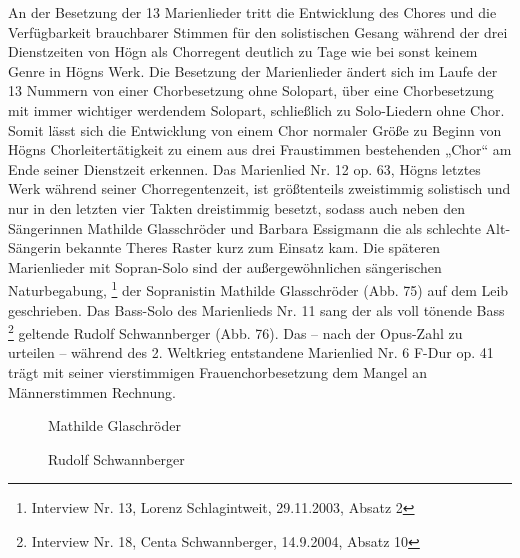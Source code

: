 An der Besetzung der 13 Marienlieder tritt die Entwicklung des Chores
und die Verfügbarkeit brauchbarer Stimmen für den solistischen Gesang
während der drei Dienstzeiten von Högn als Chorregent deutlich zu Tage
wie bei sonst keinem Genre in Högns Werk. Die Besetzung der
Marienlieder ändert sich im Laufe der 13 Nummern von einer
Chorbesetzung ohne Solopart, über eine Chorbesetzung mit immer
wichtiger werdendem Solopart, schließlich zu Solo-Liedern ohne Chor.
Somit lässt sich die Entwicklung von einem Chor normaler Größe zu
Beginn von Högns Chorleitertätigkeit zu einem aus drei Fraustimmen
bestehenden „Chor“ am Ende seiner Dienstzeit erkennen. Das Marienlied
Nr. 12 op. 63, Högns letztes Werk während seiner Chorregentenzeit, ist
größtenteils zweistimmig solistisch und nur in den letzten vier Takten
dreistimmig besetzt, sodass auch neben den Sängerinnen Mathilde
Glasschröder und Barbara Essigmann die als schlechte Alt-Sängerin
bekannte Theres Raster kurz zum Einsatz kam. Die späteren Marienlieder
mit Sopran-Solo sind der außergewöhnlichen sängerischen
Naturbegabung, \footnote{Interview Nr. 13, Lorenz Schlagintweit,
29.11.2003, Absatz 2} der Sopranistin Mathilde Glasschröder (Abb. 75)
auf dem Leib geschrieben. Das Bass-Solo des Marienlieds Nr. 11 sang der
als voll tönende Bass \footnote{Interview Nr. 18, Centa Schwannberger,
14.9.2004, Absatz 10} geltende Rudolf Schwannberger (Abb. 76). Das –
nach der Opus-Zahl zu urteilen – während des 2. Weltkrieg entstandene
Marienlied Nr. 6 F-Dur op. 41 trägt mit seiner vierstimmigen
Frauenchorbesetzung dem Mangel an Männerstimmen Rechnung.

\begin{figure}
\caption{Mathilde Glaschröder}
\end{figure}

\begin{figure}
\caption{Rudolf Schwannberger}
\end{figure}



